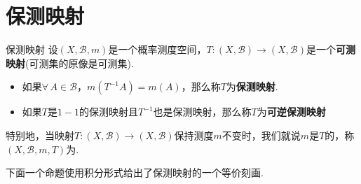 \section{保测映射}

\vspace{-0.5 em}
\begin{definition}{保测映射}
    设$(X,\mathcal{B},m)$是一个概率测度空间，$T:(X,\mathcal{B}) \to (X,\mathcal{B})$是一个\textbf{可测映射}(可测集的原像是可测集).
    \begin{itemize}
        \item 如果$\forall\, A\in\mathcal{B}$，$m(T^{-1}A)=m(A)$，那么称$T$为\textbf{保测映射}.
        \item 如果$T$是$1-1$的保测映射且$T^{-1}$也是保测映射，那么称$T$为\textbf{可逆保测映射}
    \end{itemize}
\end{definition}
特别地，当映射$T:(X,\mathcal{B}) \to (X,\mathcal{B})$保持测度$m$不变时，我们就说$m$是$T$的，称$(X,\mathcal{B},m,T)$为.\par
下面一个命题使用积分形式给出了保测映射的一个等价刻画.

